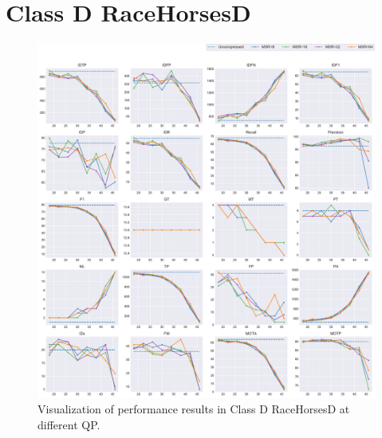 
\section{Class D RaceHorsesD}
\label{sec:appendix/RaceHorsesD_all}


\begin{figure}[!htbp]
\centering
\includegraphics[width=1.0\linewidth]{img/appendix/RaceHorsesD_all_multiplots_qp.pdf}
\caption[Visualization of performance results in Class D RaceHorsesD at different QP]
{Visualization of performance results in Class D RaceHorsesD at different QP.}
\label{fig:RaceHorsesD_all_qp}
\end{figure}

